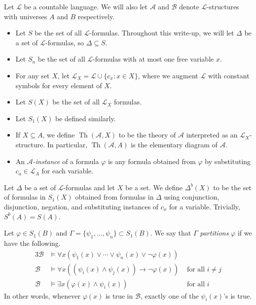 \documentclass{article}
\DeclareMathOperator{\Th}{Th}
\let\mc\mathcal
\begin{document}

\begin{notation}[Preliminaries] Let $\mc{L}$ be a countable language. We will also let $\mc{A}$ and $\mc{B}$ denote $\mc{L}$-structures with universes $A$ and $B$ respectively.
    \begin{itemize}
        \item Let $S$ be the set of all $\mc{L}$-formulas. Throughout this write-up, we will let $\Delta$ be a set of $\mc{L}$-formulas, so $\Delta \subseteq S$.
        \item Let $S_n$ be the set of all $\mc{L}$-formulas with at most one free variable $x$.
        \item For any set $X$, let $\mc{L}_X = \mc{L} \cup \{ c_x : x \in X \}$, where we augment $\mc{L}$ with constant symbols for every element of $X$.
        \item Let $S(X)$ be the set of all $\mc{L}_X$ formulas.
        \item Let $S_1(X)$ be defined similarly.
        \item If $X \subseteq A$, we define $\Th(\mc{A}, X)$ to be the theory of $\mc{A}$ interpreted as an $\mc{L}_X$-structure. In particular, $\Th(\mc{A}, A)$ is the elementary diagram of $\mc{A}$.
        \item An \textit{$\mc{A}$-instance} of a formula $\varphi$ is any formula obtained from $\varphi$ by substituting $c_a \in \mc{L}_A$ for each variable.
    \end{itemize}
\end{notation}

\begin{definition}
    Let $\Delta$ be a set of $\mc{L}$-formulas and let $X$ be a set. We define $\Delta^b(X)$ to be the set of formulas in $S_1(X)$ obtained from formulas in $\Delta$ using conjunction, disjunction, negation, and substituting instances of $c_x$ for a variable. Trivially, $S^b(A) = S(A)$.
\end{definition}

\begin{definition}[Partitioning]
   Let $\varphi \in S_1(B)$ and $\Gamma = \{ \psi_1, \ldots, \psi_n \} \subset S_1(B)$. We say that $\Gamma$ \textit{partitions} $\varphi$ if we have the following.
   \begin{alignat*}{3}
        \mc{B} &\vDash \forall x (\psi_1(x) \lor \cdots \lor \psi_n(x) \lor \neg \varphi(x)) \\
        \mc{B} &\vDash \forall x ((\psi_i(x) \land \psi_j(x)) \to \neg \varphi(x)) &\text{ for all } i \neq j \\
        \mc{B} &\vDash \exists x (\varphi(x) \land \psi_i(x)) &\text{ for all } i
   \end{alignat*}
   In other words, whenever $\varphi(x)$ is true in $\mc{B}$, exactly one of the $\psi_i(x)$'s is true.
\end{definition}
\end{document}
